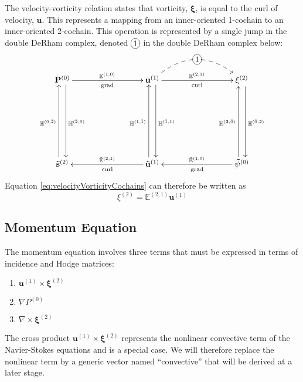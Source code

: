 The velocity-vorticity relation states that vorticity, $\mathbf{\xi}$, is equal to the curl of velocity, $\mathbf{u}$. This represents a mapping from an inner-oriented 1-cochain to an inner-oriented 2-cochain. This operation is represented by a single jump in the double DeRham complex, denoted $\xymatrix{*+[o][F-]{1}}$ in the double DeRham complex below:
\begin{equation}
    \begin{gathered}
        \xymatrix@=20ex{
            \mathbf{P}^{(0)} \ar[r]^{\mathbb{E}^{(1,0)}}_{\text{grad}} \ar@<1ex>[d]^{\mathbb{H}^{(\tilde{2},0)}} & \mathbf{u}^{(1)} \ar[r]^{\mathbb{E}^{(2,1)}}_{\text{curl}} \ar @/^6ex/ @{-->} [r]|-*+[o][F-]{1} \ar@<1ex>[d]^{\mathbb{H}^{(\tilde{1},1)}} & \mathbf{\xi}^{(2)} \ar@<1ex>[d]^{\mathbb{H}^{(\tilde{0},2)}} \\
            \mathbf{\tilde{s}}^{(2)} \ar@<1ex>[u]^{\mathbb{H}^{(0,\tilde{2})}} & \mathbf{\tilde{u}}^{(1)} \ar[l]_{\tilde{\mathbb{E}}^{(2, 1)}}^{\text{curl}} \ar@<1ex>[u]^{\mathbb{H}^{(1,\tilde{1})}} & \mathbf{\tilde{\psi}}^{(0)} \ar[l]_{\tilde{\mathbb{E}}^{(1,0)}}^{\text{grad}} \ar@<1ex>[u]^{\mathbb{H}^{(2,\tilde{0})}}
        }
    \end{gathered}
    \label{eq:DeRhamVelocityVorticity}
\end{equation}
Equation \ref{eq:velocityVorticityCochains} can therefore be written as
\begin{equation}
    \xi^{(2)} = \mathbb{E}^{(2,1)} \mathbf{u}^{(1)}
\end{equation}

\newpage

\subsection{Momentum Equation}

The momentum equation involves three terms that must be expressed in terms of incidence and Hodge matrices:
\begin{enumerate}
    \item $\mathbf{u}^{(1)} \times \mathbf{\xi}^{(2)}$
    \item $\nabla P^{(0)}$
    \item $\nabla \times \mathbf{\xi}^{(2)}$
\end{enumerate}

The cross product $\mathbf{u}^{(1)} \times \mathbf{\xi}^{(2)}$ represents the nonlinear convective term of the Navier-Stokes equations and is a special case. We will therefore replace the nonlinear term by a generic vector named ``convective'' that will be derived at a later stage.

